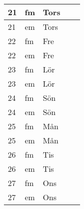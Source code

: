 \documentclass[a4paper]{article}
\begin{document}
\begin{table}[ht!]
\begin{tabular}{lllp{7cm}p{7cm}}
\multicolumn{1}{|l|}{21} & \multicolumn{1}{l|}{fm} & \multicolumn{1}{l|}{Tors} & \multicolumn{1}{l|}{} & \multicolumn{1}{l|}{} \\ \hline
\multicolumn{1}{|l|}{21} & \multicolumn{1}{l|}{em} & \multicolumn{1}{l|}{Tors} & \multicolumn{1}{l|}{} & \multicolumn{1}{l|}{} \\ \hline    

\multicolumn{1}{|l|}{22} & \multicolumn{1}{l|}{fm} & \multicolumn{1}{l|}{Fre} & \multicolumn{1}{l|}{} & \multicolumn{1}{l|}{} \\ \hline
\multicolumn{1}{|l|}{22} & \multicolumn{1}{l|}{em} & \multicolumn{1}{l|}{Fre} & \multicolumn{1}{l|}{} & \multicolumn{1}{l|}{} \\ \hline    

\multicolumn{1}{|l|}{23} & \multicolumn{1}{l|}{fm} & \multicolumn{1}{l|}{Lör} & \multicolumn{1}{l|}{} & \multicolumn{1}{l|}{} \\ \hline
\multicolumn{1}{|l|}{23} & \multicolumn{1}{l|}{em} & \multicolumn{1}{l|}{Lör} & \multicolumn{1}{l|}{} & \multicolumn{1}{l|}{} \\ \hline    

\multicolumn{1}{|l|}{24} & \multicolumn{1}{l|}{fm} & \multicolumn{1}{l|}{Sön} & \multicolumn{1}{l|}{} & \multicolumn{1}{l|}{} \\ \hline
\multicolumn{1}{|l|}{24} & \multicolumn{1}{l|}{em} & \multicolumn{1}{l|}{Sön} & \multicolumn{1}{l|}{} & \multicolumn{1}{l|}{} \\ \hline    

\multicolumn{1}{|l|}{25} & \multicolumn{1}{l|}{fm} & \multicolumn{1}{l|}{Mån} & \multicolumn{1}{l|}{} & \multicolumn{1}{l|}{} \\ \hline
\multicolumn{1}{|l|}{25} & \multicolumn{1}{l|}{em} & \multicolumn{1}{l|}{Mån} & \multicolumn{1}{l|}{} & \multicolumn{1}{l|}{} \\ \hline    

\multicolumn{1}{|l|}{26} & \multicolumn{1}{l|}{fm} & \multicolumn{1}{l|}{Tis} & \multicolumn{1}{l|}{} & \multicolumn{1}{l|}{} \\ \hline
\multicolumn{1}{|l|}{26} & \multicolumn{1}{l|}{em} & \multicolumn{1}{l|}{Tis} & \multicolumn{1}{l|}{} & \multicolumn{1}{l|}{} \\ \hline    

\multicolumn{1}{|l|}{27} & \multicolumn{1}{l|}{fm} & \multicolumn{1}{l|}{Ons} & \multicolumn{1}{l|}{} & \multicolumn{1}{l|}{} \\ \hline
\multicolumn{1}{|l|}{27} & \multicolumn{1}{l|}{em} & \multicolumn{1}{l|}{Ons} & \multicolumn{1}{l|}{} & \multicolumn{1}{l|}{} \\ \hline    


\end{tabular}
\end{table}
\end{document}
